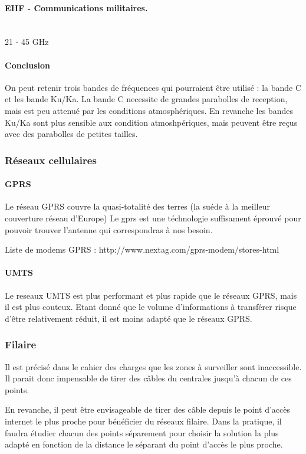         \paragraph{EHF - Communications militaires.}~\\
        21 - 45 GHz 
        
        \paragraph{Conclusion}
            On peut retenir trois bandes de fréquences qui pourraient être utilisé : la bande C et les bande Ku/Ka.
            La bande C necessite de grandes parabolles de reception, mais est peu attenué par les conditions atmosphériques.
            En revanche les bandes Ku/Ka sont plus sensible aux condition atmoshpériques, mais peuvent être reçus avec des parabolles de petites tailles.

    \subsubsection{Réseaux cellulaires}

        \paragraph{GPRS}
            Le réseau GPRS couvre la quasi-totalité des terres (la suéde à la meilleur couverture réseau d'Europe)
            Le gprs est une téchnologie suffisament éprouvé pour pouvoir trouver l'antenne qui correspondras à nos besoin.

            Liste de modems GPRS :
            http://www.nextag.com/gprs-modem/stores-html

        \paragraph{UMTS}
            Le reseaux UMTS est plus performant et plus rapide que le réseaux GPRS, mais il est plus couteux.
            Etant donné que le volume d'informations à transférer risque d'être relativement réduit, il est moins adapté que le réseaux GPRS.
            
                
    \subsubsection{Filaire}
        Il est précisé dans le cahier des charges que les zones à surveiller sont inaccessible.
        Il parait donc impensable de tirer des câbles du centrales jusqu'à chacun de ces points.

        En revanche, il peut être envisageable de tirer des câble depuis le point d'accès internet le plus proche pour bénéficier du réseaux filaire.
        Dans la pratique, il faudra étudier chacun des points séparement pour choisir la solution la plus adapté en fonction de la distance le séparant du point d'accès le plus proche.
